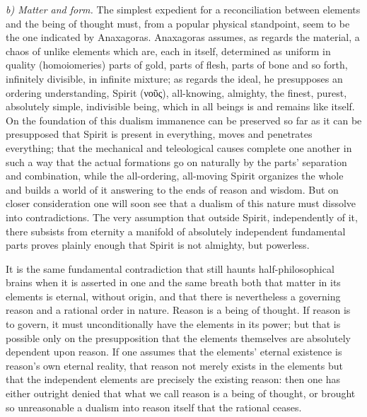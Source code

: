 \documentclass[12pt,a4paper]{book}
\newcommand{\runin}[1]{\emph{#1}\hspace{0.4em}}
\begin{document}
\runin{b) Matter and form.} The simplest expedient for a reconciliation between elements and the being of thought
must, from a popular physical standpoint, seem to be the one indicated by Anaxagoras. Anaxagoras assumes, as
regards the material, a chaos of unlike elements which are, each in itself, determined as uniform in quality
(homoiomeries) parts of gold, parts of flesh, parts of bone and so forth, infinitely divisible, in infinite
mixture; as regards the ideal, he presupposes an ordering understanding, Spirit (νοῦς), all-knowing, almighty, the
finest, purest, absolutely simple, indivisible being, which in all beings is and remains like itself. On the
foundation of this dualism immanence can be preserved so far as it can be presupposed that Spirit is present in
everything, moves and penetrates everything; that the mechanical and teleological causes complete one another in
such a way that the actual formations go on naturally by the parts' separation and combination, while the
all-ordering, all-moving Spirit organizes the whole and builds a world of it answering to the ends of reason and
wisdom. But on closer consideration one will soon see that a dualism of this nature must dissolve into
contradictions. The very assumption that outside Spirit, independently of it, there subsists from eternity a
manifold of absolutely independent fundamental parts proves plainly enough that Spirit is not almighty, but
powerless.

It is the same fundamental contradiction that still haunts half-philosophical brains when it is asserted in one
and the same breath both that matter in its elements is eternal, without origin, and that there is nevertheless a
governing reason and a rational order in nature. Reason is a being of thought. If reason is to govern, it must
unconditionally have the elements in its power; but that is possible only on the presupposition that the elements
themselves are absolutely dependent upon reason. If one assumes that the elements' eternal existence is reason's
own eternal reality, that reason not merely exists in the elements but that the independent elements are precisely
the existing reason: then one has either outright denied that what we call reason is a being of thought, or brought
so unreasonable a dualism into reason itself that the rational ceases.
\end{document}
